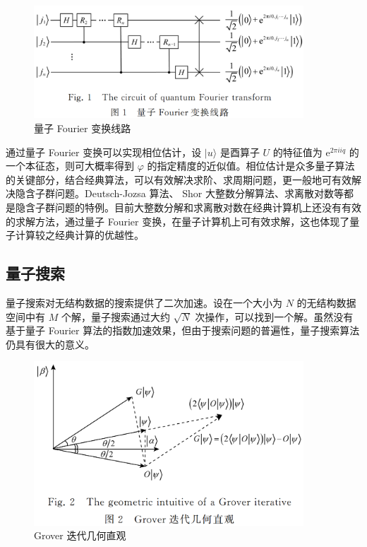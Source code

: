 \begin{figure}[htb]
\centering 
\includegraphics[width=0.90\textwidth]{img/ch2m1.png} 
\caption{量子 Fourier 变换线路}
\label{Test}
\end{figure}

通过量子 Fourier 变换可以实现相位估计，设 $|u\rangle$ 是酉算子 $U$ 的特征值为 $\mathrm{e}^{2 \pi i i q}$ 的一个本征态，则可大概率得到 $\varphi$ 的指定精度的近似值。相位估计是众多量子算法的关键部分，结合经典算法，可以有效解决求阶、求周期问题，更一般地可有效解决隐含子群问题。Deutsch-Jozsa 算法、 Shor 大整数分解算法、求离散对数等都是隐含子群问题的特例。目前大整数分解和求离散对数在经典计算机上还没有有效的求解方法，通过量子 Fourier 变换，在量子计算机上可有效求解，这也体现了量子计算较之经典计算的优越性。

\subsection{量子搜索}

量子搜索对无结构数据的搜索提供了二次加速。设在一个大小为 $N$ 的无结构数据空间中有 $M$ 个解，量子搜索通过大约 $\sqrt{N}$ 次操作，可以找到一个解。虽然没有基于量子 Fourier 算法的指数加速效果，但由于搜索问题的普遍性，量子搜索算法仍具有很大的意义。

\begin{figure}[htb]
\centering 
\includegraphics[width=0.90\textwidth]{img/ch2m2.png} 
\caption{Grover 迭代几何直观}
\label{Test}
\end{figure}


